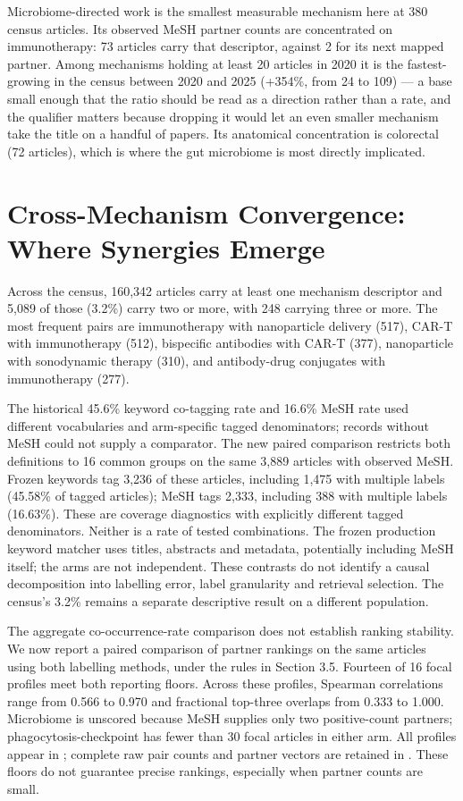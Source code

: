 \documentclass[11pt,twoside,openright]{report}
\begin{document}
Microbiome-directed work is the smallest measurable mechanism here at 380 census articles. Its observed MeSH partner counts are concentrated on immunotherapy: 73 articles carry that descriptor, against 2 for its next mapped partner. Among mechanisms holding at least 20 articles in 2020 it is the fastest-growing in the census between 2020 and 2025 (+354\%, from 24 to 109) --- a base small enough that the ratio should be read as a direction rather than a rate, and the qualifier matters because dropping it would let an even smaller mechanism take the title on a handful of papers. Its anatomical concentration is colorectal (72 articles), which is where the gut microbiome is most directly implicated.

\section{Cross-Mechanism Convergence: Where Synergies Emerge}

Across the census, 160,342 articles carry at least one mechanism descriptor and 5,089 of those (3.2\%) carry two or more, with 248 carrying three or more. The most frequent pairs are immunotherapy with nanoparticle delivery (517), CAR-T with immunotherapy (512), bispecific antibodies with CAR-T (377), nanoparticle with sonodynamic therapy (310), and antibody-drug conjugates with immunotherapy (277).

The historical 45.6\% keyword co-tagging rate and 16.6\% MeSH rate used different vocabularies and arm-specific tagged denominators; records without MeSH could not supply a comparator. The new paired comparison restricts both definitions to 16 common groups on the same 3,889 articles with observed MeSH. Frozen keywords tag 3,236 of these articles, including 1,475 with multiple labels (45.58\% of tagged articles); MeSH tags 2,333, including 388 with multiple labels (16.63\%). These are coverage diagnostics with explicitly different tagged denominators. Neither is a rate of tested combinations. The frozen production keyword matcher uses titles, abstracts and metadata, potentially including MeSH itself; the arms are not independent. These contrasts do not identify a causal decomposition into labelling error, label granularity and retrieval selection. The census's 3.2\% remains a separate descriptive result on a different population.

The aggregate co-occurrence-rate comparison does not establish ranking stability. We now report a paired comparison of partner rankings on the same articles using both labelling methods, under the rules in Section 3.5. Fourteen of 16 focal profiles meet both reporting floors. Across these profiles, Spearman correlations range from 0.566 to 0.970 and fractional top-three overlaps from 0.333 to 1.000. Microbiome is unscored because MeSH supplies only two positive-count partners; phagocytosis-checkpoint has fewer than 30 focal articles in either arm. All profiles appear in ; complete raw pair counts and partner vectors are retained in . These floors do not guarantee precise rankings, especially when partner counts are small.
\end{document}
